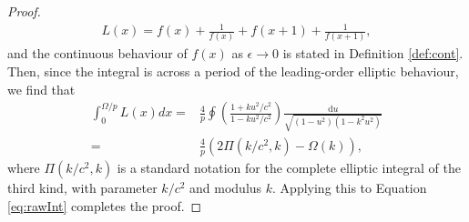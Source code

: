 \documentclass[10pt,a4paper]{amsart}
\begin{document}
\begin{proof}
\begin{align*}
        L(x)=f(x)+\frac{1}{f(x)}+f(x+1)+\frac{1}{f(x+1)},
    \end{align*}
    and the continuous behaviour of $f(x)$ as $\epsilon\to0$ is stated in Definition \ref{def:cont}. Then, since the integral is across a period of the leading-order elliptic behaviour, we find that
    \begin{align*}
        \int_{0}^{\Omega/p}L(x)dx=&\frac{4}{p}\oint\left(\frac{1+ku^2/c^2}{1-ku^2/c^2}\right)\frac{\text{d}u}{\sqrt{(1-u^2)(1-k^2u^2)}}\\
        =&\frac{4}{p}\left(2\Pi(k/c^2,k)-\Omega(k)\right),
    \end{align*}
    where $\Pi(k/c^2,k)$ is a standard notation for the complete elliptic integral of the third kind, with parameter $k/c^2$ and modulus $k$. Applying this to Equation \eqref{eq:rawInt} completes the proof.
\end{proof}
\end{document}
